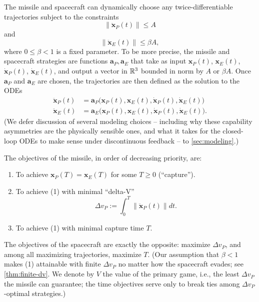 \documentclass{article}
\newcommand{\eqdef}{:=}
\renewcommand{\vec}[1]{\mathbf{#1}}
\theoremstyle{remark}
\begin{document}
The missile and spacecraft can dynamically choose any twice-differentiable trajectories
subject to the constraints \begin{equation}
  \|
  \ddot{\vec{x}}_P(t) \| \le A
\end{equation}
and
\begin{equation}
    \|
  \ddot{\vec{x}}_E(t) \| \le \beta A,
\end{equation}
where $0 \le \beta < 1$ is a fixed parameter.  To be more precise, the missile
and spacecraft strategies are functions $\vec{a}_P, \vec{a}_E$ that take as
input $\vec{x}_P(t)$, $\vec{x}_E(t)$, $\dot{\vec{x}}_P(t)$,
$\dot{\vec{x}}_E(t)$, and output a vector in $\mathbb{R}^3$ bounded in norm by $A$ or
$ \beta A$.  Once $\vec{a}_P$ and $\vec{a}_E$ are chosen, the trajectories are
then defined as the solution to the ODEs
\begin{align}
  \ddot{\vec{x}}_P(t) &= \vec{a}_P \big (\vec{x}_P(t), \vec{x}_E(t),
                        \dot{\vec{x}}_P(t), \dot{\vec{x}}_E(t) \big )\\
  \ddot{\vec{x}}_E(t) &= \vec{a}_E\big (\vec{x}_P(t), \vec{x}_E(t),
                        \dot{\vec{x}}_P(t), \dot{\vec{x}}_E(t) \big ).
\end{align}
(We defer discussion of several modeling choices -- including why these
capability asymmetries are the physically sensible ones, and what it takes
for the closed-loop ODEs to make sense under discontinuous feedback -- to
\cref{sec:modeling}.)

The objectives of the missile, in order of decreasing priority, are:
\begin{enumerate}
\item To achieve $\vec{x}_P(T) = \vec{x}_E(T)$
for some $T \ge 0$ (``capture'').
\item To achieve (1) with minimal ``delta-V''
\begin{equation}
  \label{eq:missile-delta-v}
  \Delta v_P \eqdef \int_{0}^T \big \| \ddot{\vec{x}}_P(t) \big \| dt.
\end{equation}
\item To achieve (1) with minimal capture time $T$.
\end{enumerate}
The objectives of the spacecraft are exactly the opposite: maximize $\Delta v_P$, and among all
maximizing trajectories, maximize $T$.  (Our assumption
that $\beta < 1$ makes (1) attainable with finite $\Delta v_P$ no matter how the
spacecraft evades; see \cref{thm:finite-dv}.  We denote by
$V$ the value of the primary game, i.e., the least $\Delta v_P$ the missile can
guarantee; the time objectives serve only to break ties among
$\Delta v_P$-optimal strategies.)
\end{document}
